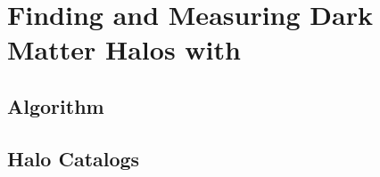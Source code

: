 
\section{Finding and Measuring Dark Matter Halos with \rockstar}
\label{sec:rockstar}



\subsection{Algorithm}



\subsection{Halo Catalogs}



